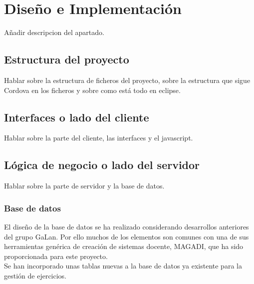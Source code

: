 
\chapter{Diseño e Implementación}
\label{diseno-e-implementacion}

Añadir descripcion del apartado.\\

\section{Estructura del proyecto}
\label{diseno-e-implementacion:estructura}

Hablar sobre la estructura de ficheros del proyecto, sobre la estructura que sigue Cordova en los ficheros y sobre como está todo en eclipse.\\

\section{Interfaces o lado del cliente}
\label{diseno-e-implementacion:interfaces}

Hablar sobre la parte del cliente, las interfaces y el javascript.\\

\section{Lógica de negocio o lado del servidor}
\label{diseno-e-implementacion:logica-negocio}

Hablar sobre la parte de servidor y la base de datos.\\

\subsection{Base de datos}
\label{diseno-e-implementacion:logica-negocio:bd}

El diseño de la base de datos se ha realizado considerando desarrollos anteriores del grupo GaLan.
Por ello muchos de los elementos son comunes con una de sus herramientas genérica de creación
de sistemas docente, MAGADI, que ha sido proporcionada para este proyecto.\\

Se han incorporado unas tablas nuevas a la base de datos ya existente para la gestión de ejercicios.\\